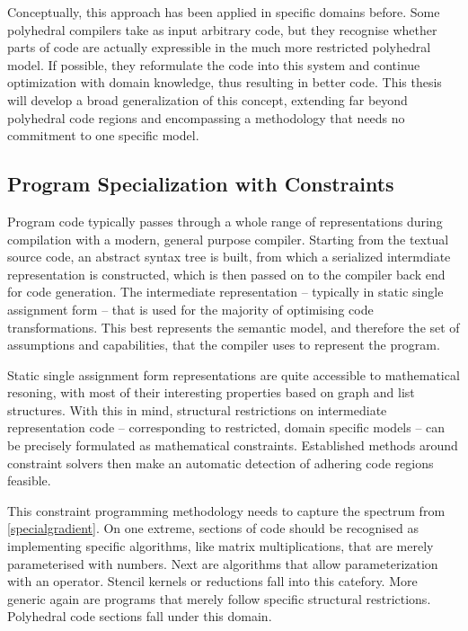     Conceptually, this approach has been applied in specific domains before.
    Some polyhedral compilers take as input arbitrary code, but they recognise
    whether parts of code are actually expressible in the much more restricted
    polyhedral model.
    If possible, they reformulate the code into this system and continue
    optimization with domain knowledge, thus resulting in better code.
    This thesis will develop a broad generalization of this concept, extending
    far beyond polyhedral code regions and encompassing a methodology that
    needs no commitment to one specific model.

\subsection{Program Specialization with Constraints}

    Program code typically passes through a whole range of representations
    during compilation with a modern, general purpose compiler.
    Starting from the textual source code, an abstract syntax tree is built,
    from which a serialized intermdiate representation is constructed,
    which is then passed on to the compiler back end for code generation.
    The intermediate representation -- typically in static single assignment
    form -- that is used for the majority of optimising code transformations.
    This best represents the semantic model, and therefore the set of
    assumptions and capabilities, that the compiler uses to represent the
    program.

    Static single assignment form representations are quite accessible to
    mathematical resoning, with most of their interesting properties based on
    graph and list structures.
    With this in mind, structural restrictions on intermediate representation
    code -- corresponding to restricted, domain specific models -- can be
    precisely formulated as mathematical constraints.
    Established methods around constraint solvers then make an automatic
    detection of adhering code regions feasible.

    This constraint programming methodology needs to capture the spectrum from
    \autoref{specialgradient}.
    On one extreme, sections of code should be recognised as implementing
    specific algorithms, like matrix multiplications, that are merely
    parameterised with numbers.
    Next are algorithms that allow parameterization with an operator.
    Stencil kernels or reductions fall into this catefory.
    More generic again are programs that merely follow specific structural
    restrictions.
    Polyhedral code sections fall under this domain.

